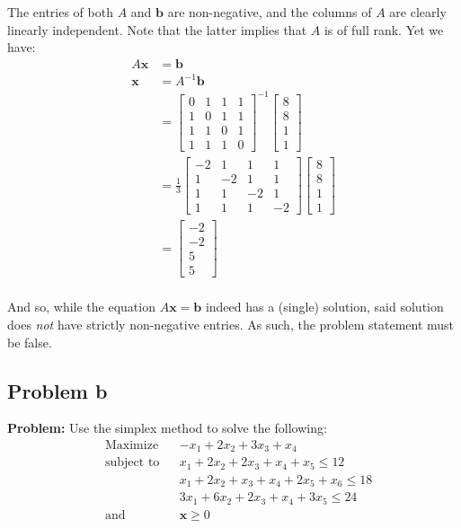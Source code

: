 \documentclass{article}
\renewcommand\vec{\mathbf}
\begin{document}
The entries of both $A$ and $\vec b$ are non-negative, and the columns of $A$ are clearly linearly independent. Note that the latter implies that $A$ is of full rank. Yet we have:
\begin{align*}
    A\vec x&=\vec b\\
    \vec x&=A^{-1}\vec b\tag{full rank $\rightarrow$ invertible}\\
    &=\begin{bmatrix}
        0&1&1&1\\
        1&0&1&1\\
        1&1&0&1\\
        1&1&1&0
    \end{bmatrix}^{-1}\begin{bmatrix}
        8\\8\\1\\1
    \end{bmatrix}\\
    &=\frac{1}{3}\begin{bmatrix}
        -2&1&1&1\\
        1&-2&1&1\\
        1&1&-2&1\\
        1&1&1&-2
    \end{bmatrix}\begin{bmatrix}
        8\\8\\1\\1
    \end{bmatrix}\\
    &=\begin{bmatrix}
        -2\\-2\\5\\5
    \end{bmatrix}\\
\end{align*}

And so, while the equation $A\vec x=\vec b$ indeed has a (single) solution, said solution does \textit{not} have strictly non-negative entries. As such, the problem statement must be false.

\subsection*{Problem b}
\noindent\textbf{Problem:} Use the simplex method to solve the following:
$$\begin{aligned}
    &{\text{Maximize}}
    &&-x_1+2x_2+3x_3+x_4\\
    &{\text{subject to}}
    &&x_1+2x_2+2x_3+x_4+x_5\le12\\
    &
    &&x_1+2x_2+x_3+x_4+2x_5+x_6\le18\\
    &
    &&3x_1+6x_2+2x_3+x_4+3x_5\le24\\
    &{\text{and}}
    &&\vec x\ge 0
\end{aligned}$$
\bigskip
\end{document}
